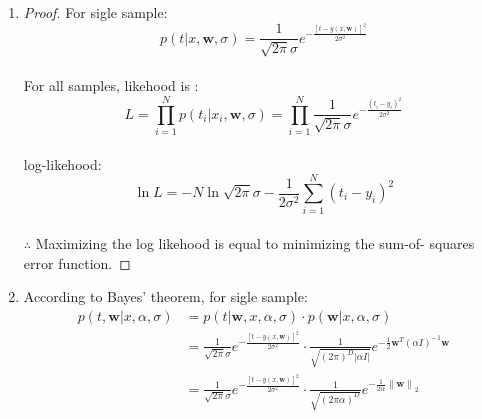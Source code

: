 \documentclass{article}
\newcommand{\norm}[2]{\left\| #1 \right\|_{#2}}
\begin{document}
\begin{enumerate}[(1)]
	\item 
	\begin{proof}
	For sigle sample:\\

	$$p(t|x,\textbf{w}, \sigma) = \frac{1}{\sqrt{2\pi}\sigma}e^{-\frac{[t-y(x,\textbf{w})]^2}{2\sigma^2}}$$\\
	For all samples, likehood is :\\
	$$L = \prod_{i=1}^{N} p(t_i|x_i,\bm{w}, \sigma) = \prod_{i=1}^{N}\frac{1}{\sqrt{2\pi}\sigma}e^{-\frac{(t_i-y_i)^2}{2\sigma^2}}$$\\
	log-likehood: \\
	$$\ln{L} = -N\ln{\sqrt{2\pi}\sigma}-\frac{1}{2\sigma^2}\sum_{i=1}^{N}(t_i-y_i)^2$$\\
	$\therefore$ Maximizing the log likehood is equal to minimizing the sum-of- squares error function.
	\end{proof}
	\item 
	According to Bayes' theorem, for sigle sample:\\
	\begin{equation}
	\begin{aligned}
	p(t,\bm{w}|x, \alpha, \sigma) &= p(t|\bm{w}, x,\alpha, \sigma)\cdot p(\bm{w}|x,\alpha, \sigma)\\
	&=\frac{1}{\sqrt{2\pi}\sigma}e^{-\frac{[t-y(x,\textbf{w})]^2}{2\sigma^2}}\cdot \frac{1}{\sqrt{(2\pi)^D|\alpha I|}}e^{-\frac{1}{2}\bm{w}^T(\alpha I)^{-1}\bm{w}}\\
	&=\frac{1}{\sqrt{2\pi}\sigma}e^{-\frac{[t-y(x,\textbf{w})]^2}{2\sigma^2}}\cdot \frac{1}{\sqrt{(2\pi\alpha)^D}}e^{-\frac{1}{2\alpha}\norm{\bm{w}}2}

\end{aligned}
\end{equation}
\end{enumerate}
\end{document}
